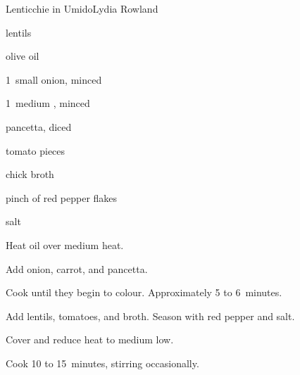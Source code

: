 \begin{recipe}{Lenticchie in Umido}{Lydia Rowland}{}

\begin{ingredients}
\item {} lentils
\item \C{\third} olive oil
\item 1~small onion, minced
\item 1~medium , minced
\item {} pancetta, diced
\item {} tomato pieces
\item {} chick broth
\item pinch of red pepper flakes
\item salt
\end{ingredients}

\begin{directions}
\item Heat oil over medium heat.
\item Add onion, carrot, and pancetta.
\item Cook until they begin to colour. Approximately 5 to 6~minutes.
\item Add lentils, tomatoes, and broth. Season with red pepper and salt.
\item Cover and reduce heat to medium low.
\item Cook 10 to 15~minutes, stirring occasionally.
\end{directions}

\end{recipe}
